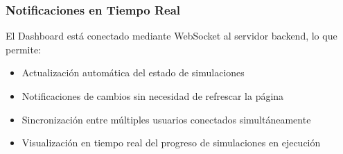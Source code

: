 \subsubsection{Notificaciones en Tiempo Real}
El Dashboard está conectado mediante WebSocket al servidor backend, lo que permite:
\begin{itemize}
    \item Actualización automática del estado de simulaciones
    \item Notificaciones de cambios sin necesidad de refrescar la página
    \item Sincronización entre múltiples usuarios conectados simultáneamente
    \item Visualización en tiempo real del progreso de simulaciones en ejecución
\end{itemize}
